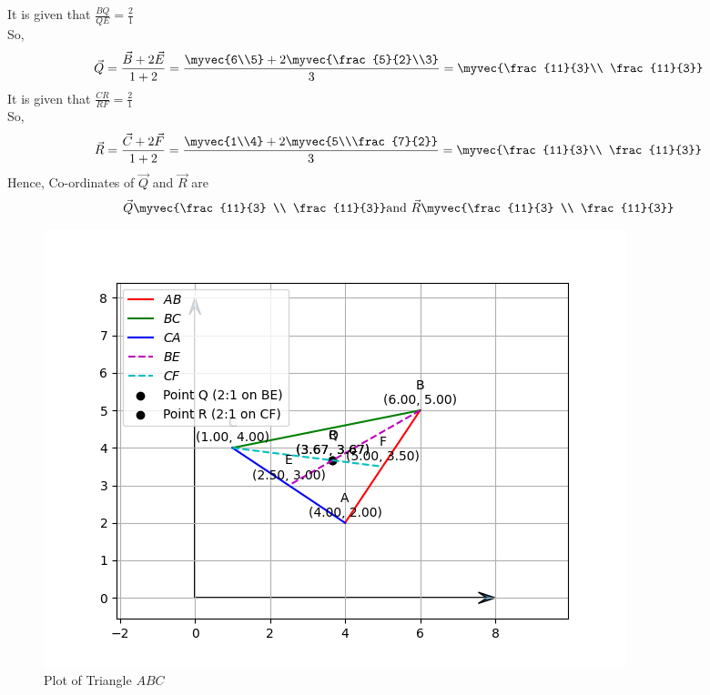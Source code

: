 \documentclass[journal]{IEEEtran}
\numberwithin{equation}{enumi}
\numberwithin{figure}{enumi}
\begin{document}
It is given that $\frac{BQ}{QE}=\frac{2}{1}$\\
So,\\
\begin{align}
	\vec{Q}=\frac{\vec{B}+2\vec{E}}{1+2}=\frac{\myvec{6\\5} + 2\myvec{\frac{5}{2}\\3}}{3}=\myvec{\frac{11}{3}\\ \frac{11}{3}}
\end{align}
It is given that $\frac{CR}{RF}=\frac{2}{1}$\\
So,\\
\begin{align}
	\vec{R}=\frac{\vec{C}+2\vec{F}}{1+2}=\frac{\myvec{1\\4} + 2\myvec{5\\\frac{7}{2}}}{3}=\myvec{\frac{11}{3}\\ \frac{11}{3}}
\end{align}
Hence, Co-ordinates of $\vec{Q}$ and $\vec{R}$ are\\
\begin{align}
    \vec{Q}\myvec{\frac{11}{3} \\ \frac{11}{3}} \text{and}\ \vec{R}\myvec{\frac{11}{3} \\ \frac{11}{3}}
\end{align}
\begin{figure}[h!]
   \centering
   \includegraphics[width=0.7\linewidth]{figs/Figure_1.png}
   \caption{Plot of Triangle $ABC$}
   \label{stemplot}
\end{figure}
\end{document}
